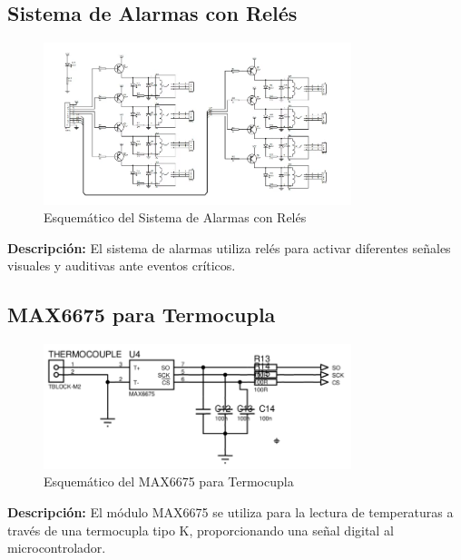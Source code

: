 \subsection{Sistema de Alarmas con Relés}
\begin{figure}[H]
    \centering
    \includegraphics[width=0.8\textwidth]{Imagenes/Placa reles 8 canales.png}
    \caption{Esquemático del Sistema de Alarmas con Relés}
    \label{fig:alarmas_reles}
\end{figure}
\textbf{Descripción:} El sistema de alarmas utiliza relés para activar diferentes señales visuales y auditivas ante eventos críticos.

\subsection{MAX6675 para Termocupla}
\begin{figure}[H]
    \centering
    \includegraphics[width=0.8\textwidth]{Imagenes/MAX6675.png}
    \caption{Esquemático del MAX6675 para Termocupla}
    \label{fig:max6675}
\end{figure}
\textbf{Descripción:} El módulo MAX6675 se utiliza para la lectura de temperaturas a través de una termocupla tipo K, proporcionando una señal digital al microcontrolador.

